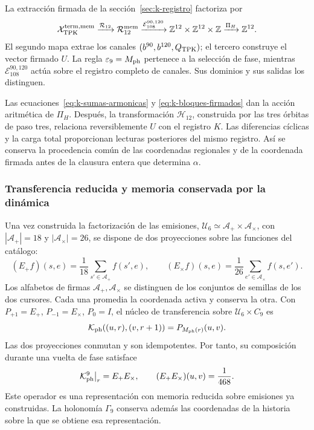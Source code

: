 La extracción firmada de la sección~\ref{sec:k-registro} factoriza por
\begin{equation}
 \mathcal X_{\rm TPK}^{\rm term,mem}
 \xrightarrow{\mathcal R_{12}}\mathcal R_{12}^{\rm mem}
 \xrightarrow{\mathcal E_{108}^{90,120}}
 \mathbb Z^{12}\times\mathbb Z^{12}\times\mathbb Z
 \xrightarrow{\Pi_H}\mathbb Z^{12}.
 \label{ii:tpk-extraccion-tipada}
\end{equation}
El segundo mapa extrae los canales
\((b^{90},b^{120},Q_{\rm TPK})\); el tercero construye el vector
firmado \(U\). La regla \(\varepsilon_9=M_{\rm ph}\) pertenece a la
selección de fase, mientras \(\mathcal E_{108}^{90,120}\) actúa sobre
el registro completo de canales. Sus dominios y sus salidas los distinguen.

Las ecuaciones~\eqref{eq:k-sumas-armonicas} y
\eqref{eq:k-bloques-firmados} dan la acción aritmética de \(\Pi_H\).
Después, la transformación \(\mathcal H_{12}\), construida por las
tres órbitas de paso tres, relaciona reversiblemente \(U\) con el
registro \(K\). Las diferencias cíclicas y la carga total proporcionan
lecturas posteriores del mismo registro. Así se conserva la procedencia
común de las coordenadas regionales y de la coordenada firmada antes de la
clausura entera que determina \(\alpha\).

\subsubsection{Transferencia reducida y memoria conservada por la dinámica}

Una vez construida la factorización de las emisiones,
\(\mathcal U_6\simeq\mathcal A_+\times\mathcal A_\times\), con
\(|\mathcal A_+|=18\) y \(|\mathcal A_\times|=26\), se dispone de
dos proyecciones sobre las funciones del catálogo:
\[
 (E_+f)(s,e)=\frac1{18}\sum_{s'\in\mathcal A_+}f(s',e),\qquad
 (E_\times f)(s,e)=\frac1{26}\sum_{e'\in\mathcal A_\times}f(s,e').
\]
Los alfabetos de firmas \(\mathcal A_+,\mathcal A_\times\) se
distinguen de los conjuntos de semillas de los dos cursores.
Cada una promedia la coordenada activa y conserva la otra. Con
\(P_{+1}=E_+\), \(P_{-1}=E_\times\), \(P_0=I\), el núcleo
de transferencia sobre \(\mathcal U_6\times C_9\) es
\[
 \mathcal K_{\rm ph}((u,r),(v,r+1))=P_{M_{\rm ph}(r)}(u,v).
\]
Las dos proyecciones conmutan y son idempotentes. Por tanto, su composición
durante una vuelta de fase satisface
\begin{equation}
 \mathcal K_{\rm ph}^{9}\big|_r=E_+E_\times,\qquad
 (E_+E_\times)(u,v)=\frac1{468}.
 \label{ii:tpk-renovacion}
\end{equation}
Este operador es una representación con memoria reducida sobre emisiones ya
construidas. La holonomía \(\Gamma_9\) conserva además las
coordenadas de la historia sobre la que se obtiene esa representación.

